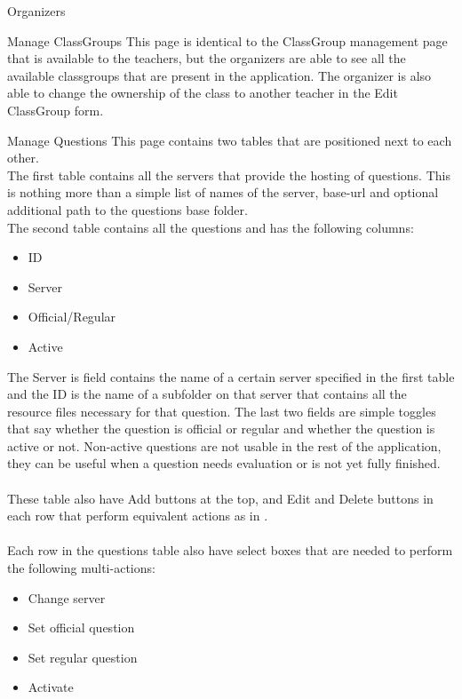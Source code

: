 \begin{section}{Organizers}
	\begin{subsection}{Manage ClassGroups}
		This page is identical to the ClassGroup management page that is available to the
		teachers, but the organizers are able to see all the available classgroups that
		are present in the application. The organizer is also able to change the ownership
		of the class to another teacher in the Edit ClassGroup form.
	\end{subsection}
	
	\begin{subsection}{Manage Questions}
		This page contains two tables that are positioned next to each other. \\
		The first table contains all the servers that provide the hosting of questions.
		This is nothing more than a simple list of names of the server, base-url and
		optional additional path to the questions base folder. \\
		The second table contains all the questions and has the following columns:
		\begin{itemize}
			\item ID
			\item Server
			\item Official/Regular
			\item Active
		\end{itemize}
		The Server is field contains the name of a certain server specified in the first
		table and the ID is the name of a subfolder on that server that contains all the
		resource files necessary for that question.
		The last two fields are simple toggles that say whether the question is official
		or regular and whether the question is active or not. Non-active questions are
		not usable in the rest of the application, they can be useful when a question
		needs evaluation or is not yet fully finished. \\
		\\
		These table also have Add buttons at the top, and Edit and Delete buttons in each
		row that perform equivalent actions as in .
		\\
		\\
		Each row in the questions table also have select boxes that are needed to perform
		the following multi-actions:
		\begin{itemize}
			\item Change server
			\item Set official question
			\item Set regular question
			\item Activate

\end{itemize}
\end{subsection}
\end{section}
